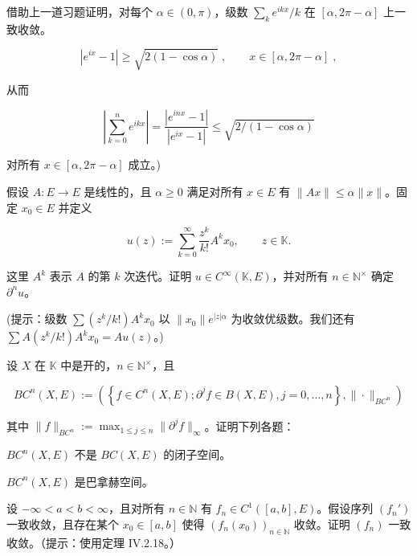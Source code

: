 \begin{exercises}
\item[8.]

借助上一道习题证明，对每个 $\alpha\in(0,\pi)$，级数 $\sum_{k}e^{ikx}/k$ 在 $[\alpha,2\pi-\alpha]$ 上一致收敛。

\[
|e^{i x}-1|\geq\sqrt{2(1-\operatorname{c o s}\alpha)}\;,\qquad x\in[\alpha,2\pi-\alpha]\;,
\]

从而

\[
\left|\sum_{k=0}^{n}e^{i k x}\right|=\frac{\left|e^{i n x}-1\right|}{\left|e^{i x}-1\right|}\leq\sqrt{2/(1-\cos\alpha)}
\]

对所有 $ x \in [\alpha, 2\pi - \alpha] $ 成立。)

\item[9.]

假设 $ A: E \to E $ 是线性的，且 $ \alpha \geq 0 $ 满足对所有 $ x \in E $ 有 $ \|Ax\| \leq \alpha \|x\| $。固定 $ x_0 \in E $ 并定义

\[
u(z):=\sum_{k=0}^{\infty}\frac{z^{k}}{k!}A^{k}x_{0},\qquad z\in\mathbb{K}.
\]

这里 $ A^k $ 表示 $ A $ 的第 $ k $ 次迭代。证明 $ u \in C^\infty(\mathbb{K}, E) $，并对所有 $ n \in \mathbb{N}^\times $ 确定 $ \partial^n u $。

(提示：级数 $ \sum(z^k/k!)A^k x_0 $ 以 $ \|x_0\| e^{|z|\alpha} $ 为收敛优级数。我们还有 $ \sum A(z^k/k!)A^k x_0 = Au(z) $。)

\item[10.]

设 $X$ 在 $\mathbb{K}$ 中是开的，$n \in \mathbb{N}^\times$，且

\[
B C^{n}(X,E):=\left(\left\{f\in C^{n}(X,E);\partial^{j}f\in B(X,E),j=0,\ldots,n\right\},\|\cdot\|_{B C^{n}}\right)
\]

其中 $ \|f\|_{BC^n} := \max_{1 \leq j \leq n} \|\partial^j f\|_\infty $。证明下列各题：

\begin{items}
\item

$ BC^{n}(X,E) $ 不是 $ BC(X,E) $ 的闭子空间。

\item

$ BC^{n}(X,E) $ 是巴拿赫空间。

\end{items}

\item[11.]

设 $ -\infty < a < b < \infty $，且对所有 $ n \in \mathbb{N} $ 有 $ f_n \in C^1([a, b], E) $。假设序列 $ (f_n') $ 一致收敛，且存在某个 $ x_0 \in [a, b] $ 使得 $ (f_n(x_0))_{n \in \mathbb{N}} $ 收敛。证明 $ (f_n) $ 一致收敛。（提示：使用定理 IV.2.18。）

\end{exercises}

